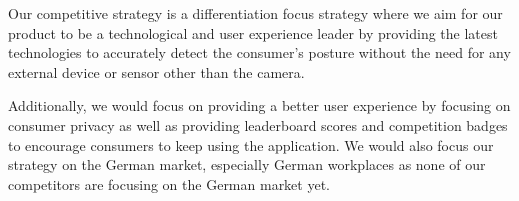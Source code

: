 \documentclass{article}
\begin{document}
Our competitive strategy is a differentiation focus strategy where we aim for our product to be a technological and user experience leader by providing the latest technologies to accurately detect the consumer’s posture without the need for any external device or sensor other than the camera. 

Additionally, we would focus on providing a better user experience by focusing on consumer privacy as well as providing leaderboard scores and competition badges to encourage consumers to keep using the application. We would also focus our strategy on the German market, especially German workplaces as none of our competitors are focusing on the German market yet.
\end{document}
